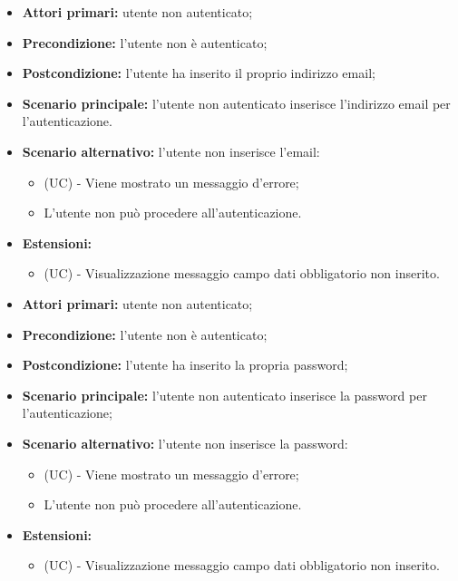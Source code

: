 \resetSubUC
{}
\begin{itemize}
	\item \textbf{Attori primari:} utente non autenticato;
	\item \textbf{Precondizione:} l'utente non è autenticato;
	\item \textbf{Postcondizione:} l'utente ha inserito il proprio indirizzo email;
	\item \textbf{Scenario principale:} l'utente non autenticato inserisce l'indirizzo email per l'autenticazione.
	\item \textbf{Scenario alternativo:} l'utente non inserisce l'email:
	\begin{itemize}
		\item (UC) - Viene mostrato un messaggio d'errore;
		\item L'utente non può procedere all'autenticazione.
	\end{itemize}
	\item \textbf{Estensioni:}
	\begin{itemize}
		\item (UC) - Visualizzazione messaggio campo dati obbligatorio non inserito.
	\end{itemize}
\end{itemize}

\begin{itemize}
	\item \textbf{Attori primari:} utente non autenticato;
	\item \textbf{Precondizione:} l'utente non è autenticato;
	\item \textbf{Postcondizione:} l'utente ha inserito la propria password;
	\item \textbf{Scenario principale:} l'utente non autenticato inserisce la password per l'autenticazione;
	\item \textbf{Scenario alternativo:} l'utente non inserisce la password:
	\begin{itemize}
		\item (UC) - Viene mostrato un messaggio d'errore;
		\item L'utente non può procedere all'autenticazione.
	\end{itemize}
	\item \textbf{Estensioni:}
	\begin{itemize}
		\item (UC) - Visualizzazione messaggio campo dati obbligatorio non inserito.
	\end{itemize}
\end{itemize}

